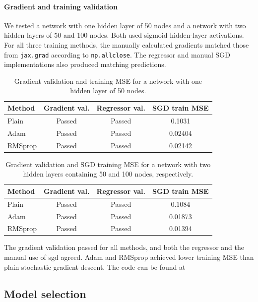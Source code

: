\paragraph{Gradient and training validation}
We tested a network with one hidden layer of 50 nodes and a network with two
hidden layers of 50 and 100 nodes. Both used sigmoid hidden-layer
activations. For all three training methods, the manually calculated
gradients matched those from \texttt{jax.grad} according to
\texttt{np.allclose}. The regressor and manual SGD implementations also
produced matching predictions.

\begin{table}[htbp]
    \centering
    \caption{Gradient validation and training MSE for a network with one
    hidden layer of 50 nodes.}
    \label{tab:regressor-val}
    \begin{tabular}{lccc}
        \hline
        Method & Gradient val. & Regressor val. & SGD train MSE\\
        \hline
        Plain   & Passed & Passed & 0.1031 \\
        Adam    & Passed & Passed & 0.02404  \\
        RMSprop & Passed & Passed & 0.02142  \\
        \hline
    \end{tabular}
\end{table}
\begin{table}[htbp]
    \centering
    \caption{Gradient validation and SGD training MSE for a network with
    two hidden layers containing 50 and 100 nodes, respectively.}
    \label{tab:regressor-val-two-layers}
    \begin{tabular}{lccc}
        \hline
        Method & Gradient val. & Regressor val. & SGD train MSE \\
        \hline
        Plain   & Passed & Passed & 0.1084  \\
        Adam    & Passed & Passed & 0.01873 \\
        RMSprop & Passed & Passed & 0.01394 \\
        \hline
    \end{tabular}
\end{table}
The gradient validation passed for all methods, and both the regressor and the
manual use of sgd agreed. Adam and RMSprop achieved lower training 
MSE than plain stochastic gradient descent. The code can be found at
\cite{FYSSTK4155Prosjekt2ProsjektKode}

\subsection{Model selection}
